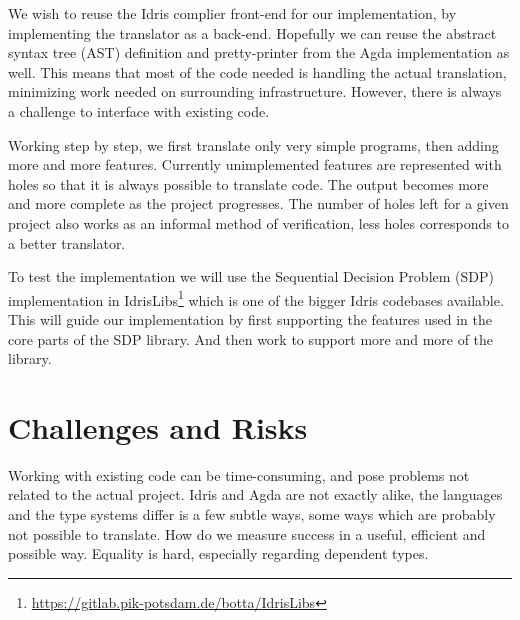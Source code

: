 \documentclass[parskip=half]{scrartcl}
\begin{document}




We wish to reuse the Idris complier front-end for our implementation, by
implementing the translator as a back-end. Hopefully we can reuse the abstract
syntax tree (AST) definition and pretty-printer from the Agda implementation as
well. This means that most of the code needed is handling the actual
translation, minimizing work needed on surrounding infrastructure.  However,
there is always a challenge to interface with existing code.


Working step by step, we first translate only very simple programs, then adding
more and more features. Currently unimplemented features are represented with
holes so that it is always possible to translate code. The output becomes more
and more complete as the project progresses. The number of holes left for
a given project also works as an informal method of verification, less holes
corresponds to a better translator.

To test the implementation we will use the Sequential Decision Problem (SDP)
implementation in
IdrisLibs\footnote{\url{https://gitlab.pik-potsdam.de/botta/IdrisLibs}} which
is one of the bigger Idris codebases available. This will guide our
implementation by first supporting the features used in the core parts of the
SDP library. And then work to support more and more of the library.


\section{Challenges and Risks}
Working with existing code can be time-consuming, and pose problems not related
to the actual project.  Idris and Agda are not exactly alike, the languages and
the type systems differ is a few subtle ways, some ways which are probably not
possible to translate.  How do we measure success in a useful, efficient and
possible way. Equality is hard, especially regarding dependent types.
\end{document}
